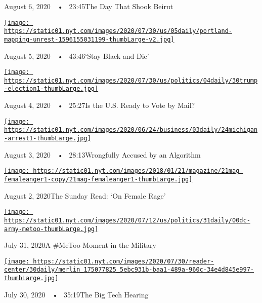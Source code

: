 August 6, 2020~~•~ 23:45The Day That Shook Beirut

\href{https://www.nytimes.com/2020/08/05/podcasts/the-daily/protests-racism-police-brutality.html?action=click\&module=audio-series-bar\&region=header\&pgtype=Article}{\texttt{[image: https://static01.nyt.com/images/2020/07/30/us/05daily/portland-mapping-unrest-1596155031199-thumbLarge-v2.jpg]}}

August 5, 2020~~•~ 43:46`Stay Black and Die'

\href{https://www.nytimes.com/2020/08/04/podcasts/the-daily/mail-in-voting-president-trump.html?action=click\&module=audio-series-bar\&region=header\&pgtype=Article}{\texttt{[image: https://static01.nyt.com/images/2020/07/30/us/politics/04daily/30trump-election1-thumbLarge.jpg]}}

August 4, 2020~~•~ 25:27Is the U.S. Ready to Vote by Mail?

\href{https://www.nytimes.com/2020/08/03/podcasts/the-daily/algorithmic-justice-racism.html?action=click\&module=audio-series-bar\&region=header\&pgtype=Article}{\texttt{[image: https://static01.nyt.com/images/2020/06/24/business/03daily/24michigan-arrest1-thumbLarge.jpg]}}

August 3, 2020~~•~ 28:13Wrongfully Accused by an Algorithm

\href{https://www.nytimes.com/2020/08/02/podcasts/the-daily/on-female-rage.html?action=click\&module=audio-series-bar\&region=header\&pgtype=Article}{\texttt{[image: https://static01.nyt.com/images/2018/01/21/magazine/21mag-femaleanger1-copy/21mag-femaleanger1-thumbLarge.jpg]}}

August 2, 2020The Sunday Read: `On Female Rage'

\href{https://www.nytimes.com/2020/07/31/podcasts/the-daily/vanessa-guillen-military-metoo.html?action=click\&module=audio-series-bar\&region=header\&pgtype=Article}{\texttt{[image: https://static01.nyt.com/images/2020/07/12/us/politics/31daily/00dc-army-metoo-thumbLarge.jpg]}}

July 31, 2020A \#MeToo Moment in the Military

\href{https://www.nytimes.com/2020/07/30/podcasts/the-daily/congress-facebook-amazon-google-apple.html?action=click\&module=audio-series-bar\&region=header\&pgtype=Article}{\texttt{[image: https://static01.nyt.com/images/2020/07/30/reader-center/30daily/merlin\_175077825\_5ebc931b-baa1-489a-960c-34e4d845e997-thumbLarge.jpg]}}

July 30, 2020~~•~ 35:19The Big Tech Hearing


